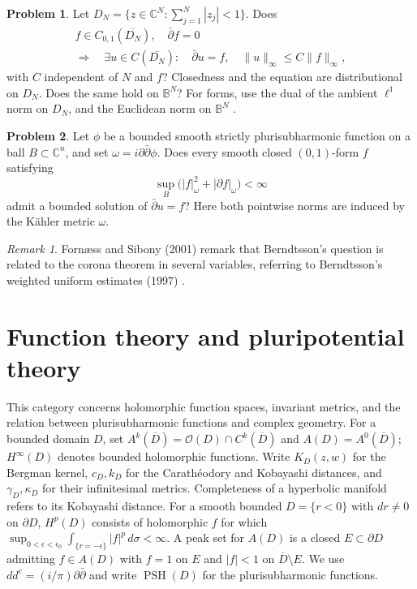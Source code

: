 \documentclass[11pt,reqno]{amsart}
\DeclareMathOperator{\PSH}{PSH}
\theoremstyle{definition}
\newtheorem{problem}{Problem}[section]
\theoremstyle{remark}
\newtheorem*{remark}{Remark}
\begin{document}
\begin{problem}\label{FS-3.3}
Let $D_N=\{z\in\mathbb C^N:\sum_{j=1}^N|z_j|<1\}$. Does
\[
\begin{gathered}
 f\in C_{0,1}(\overline{D_N}),\quad\bar\partial f=0\\
 \Longrightarrow\quad\exists u\in C(\overline{D_N}):\quad
 \bar\partial u=f,\quad\|u\|_\infty\leq C\|f\|_\infty,
\end{gathered}
\]
with $C$ independent of $N$ and $f$? Closedness and the equation are distributional on $D_N$. Does the same hold on $\mathbb B^N$? For forms, use the dual of the ambient $\ell^1$ norm on $D_N$, and the Euclidean norm on $\mathbb B^N$ \cite[\S2]{FS-Lempert}.
\end{problem}


\begin{problem}\label{FS-3.4}
Let $\phi$ be a bounded smooth strictly plurisubharmonic function on a ball $B\subset\mathbb C^n$, and set $\omega=i\partial\bar\partial\phi$. Does every smooth closed $(0,1)$-form $f$ satisfying
\[
 \sup_B\bigl(|f|_\omega^2+|\partial f|_\omega\bigr)<\infty
\]
admit a bounded solution of $\bar\partial u=f$? Here both pointwise norms are induced by the K\"ahler metric $\omega$.
\end{problem}
\begin{remark}
Forn\ae ss and Sibony (2001) remark that Berndtsson's question is related to the corona theorem in several variables, referring to Berndtsson's weighted uniform estimates (1997) \cite[Question~3.4]{FS2001}\cite{FS-Berndtsson}.
\end{remark}

\section{Function theory and pluripotential theory}

This category concerns holomorphic function spaces, invariant metrics, and the relation between plurisubharmonic functions and complex geometry. For a bounded domain $D$, set $A^k(\overline D)=\mathcal O(D)\cap C^k(\overline D)$ and $A(D)=A^0(\overline D)$; $H^\infty(D)$ denotes bounded holomorphic functions. Write $K_D(z,w)$ for the Bergman kernel, $c_D,k_D$ for the Carath\'eodory and Kobayashi distances, and $\gamma_D,\kappa_D$ for their infinitesimal metrics. Completeness of a hyperbolic manifold refers to its Kobayashi distance. For a smooth bounded $D=\{r<0\}$ with $dr\ne0$ on $\partial D$, $H^p(D)$ consists of holomorphic $f$ for which $\sup_{0<\epsilon<\epsilon_0}\int_{\{r=-\epsilon\}}|f|^p\,d\sigma<\infty$. A peak set for $A(D)$ is a closed $E\subset\partial D$ admitting $f\in A(D)$ with $f=1$ on $E$ and $|f|<1$ on $\overline D\setminus E$. We use $dd^c=(i/\pi)\partial\bar\partial$ and write $\PSH(D)$ for the plurisubharmonic functions.
\end{document}
